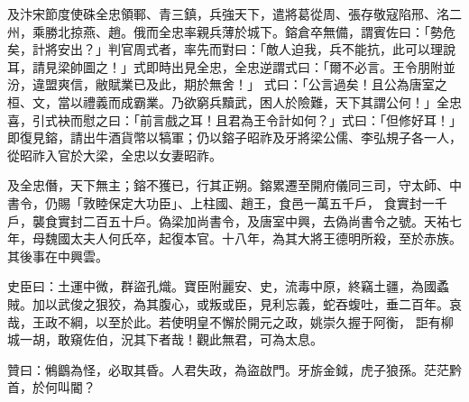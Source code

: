 \begin{pinyinscope}
 及汴宋節度使硃全忠領鄆、青三鎮，兵強天下，遣將葛從周、張存敬寇陷邢、洺二州，乘勝北掠燕、趙。俄而全忠率親兵薄於城下。鎔倉卒無備，謂賓佐曰：「勢危矣，計將安出？」判官周式者，率先而對曰：「敵人迫我，兵不能抗，此可以理說耳，請見梁帥圖之！」式即時出見全忠，全忠逆謂式曰：「爾不必言。王令朋附並汾，違盟爽信，敝賦業已及此，期於無舍！」
 式曰：「公言過矣！且公為唐室之桓、文，當以禮義而成霸業。乃欲窮兵黷武，困人於險難，天下其謂公何！」全忠喜，引式袂而慰之曰：「前言戲之耳！且君為王令計如何？」式曰：「但修好耳！」即復見鎔，請出牛酒貨幣以犒軍；仍以鎔子昭祚及牙將梁公儒、李弘規子各一人，從昭祚入官於大梁，全忠以女妻昭祚。



 及全忠僭，天下無主；鎔不獲已，行其正朔。鎔累遷至開府儀同三司，守太師、中書令，仍賜「敦睦保定大功臣」、上柱國、趙王，食邑一萬五千戶，
 食實封一千戶，襲食實封二百五十戶。偽梁加尚書令，及唐室中興，去偽尚書令之號。天祐七年，母魏國太夫人何氏卒，起復本官。十八年，為其大將王德明所殺，至於赤族。其後事在中興雲。



 史臣曰：土運中微，群盜孔熾。寶臣附麗安、史，流毒中原，終竊土疆，為國蟊賊。加以武俊之狠狡，為其腹心，或叛或臣，見利忘義，蛇吞蝮吐，垂二百年。哀哉，王政不綱，以至於此。若使明皇不懈於開元之政，姚崇久握于阿衡，
 詎有柳城一胡，敢窺佐伯，況其下者哉！觀此無君，可為太息。



 贊曰：鵂鶹為怪，必取其昏。人君失政，為盜啟門。牙旂金鉞，虎子狼孫。茫茫黔首，於何叫閽？



\end{pinyinscope}